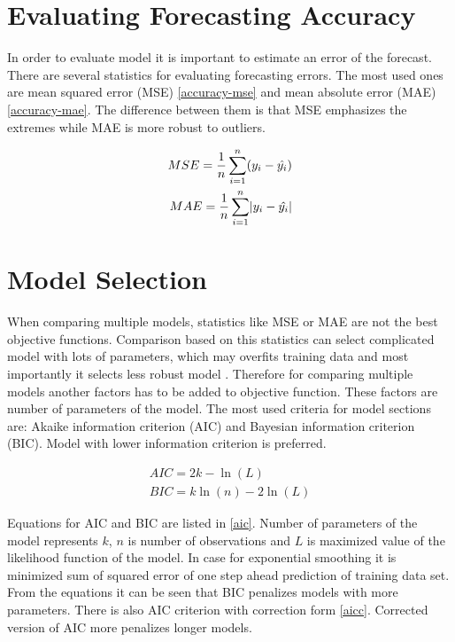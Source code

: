     \section{Evaluating Forecasting Accuracy}
    In order to evaluate model it is important to estimate an error of the forecast. There are 
    several statistics for evaluating forecasting errors. The most used ones are mean squared error (MSE)
    \ref{accuracy-mse} and mean absolute error (MAE) \ref{accuracy-mae}. The difference between them is that MSE
    emphasizes the extremes while MAE is more robust to outliers.

    \begin{subequations} \label{accuracy}
        \begin{align} \label{accuracy-mse}
             MSE = \frac{1}{n} \sum_{i=1}^{n}(y_i - \hat{y_i}) \\ \label{accuracy-mae}
             MAE = \frac{1}{n} \sum_{i=1}^{n} \abs{y_i - \hat{y_i}}
         \end{align}
    \end{subequations}

    \section{Model Selection} \label{model-selection}
    When comparing multiple models, statistics like MSE or MAE are not the best objective functions. Comparison
    based on this statistics can select complicated model with lots of parameters, which may overfits training data
    and most importantly it selects less robust model \cite{cipra}. Therefore for comparing multiple models another
    factors has to be added to objective function. These factors are number of parameters of the model. The
    most used criteria for model sections are: Akaike information criterion (AIC) and Bayesian information
    criterion (BIC). Model with lower information criterion is preferred.

    \begin{eqnarray} \label{aic}
        AIC = 2 k - \ln(L) \\ \nonumber
        BIC = k \ln(n) - 2 \ln(L)
    \end{eqnarray}

    Equations for AIC and BIC are listed in \ref{aic}. Number of parameters of the model represents $k$, $n$ is number
    of observations and $L$ is maximized value of the likelihood function of the model. In case for exponential
    smoothing it is minimized sum of squared error of one step ahead prediction of training data set. From the
    equations it can be seen that BIC penalizes models with more parameters. There is also AIC criterion with
    correction form \ref{aicc}. Corrected version of AIC more penalizes longer models.

